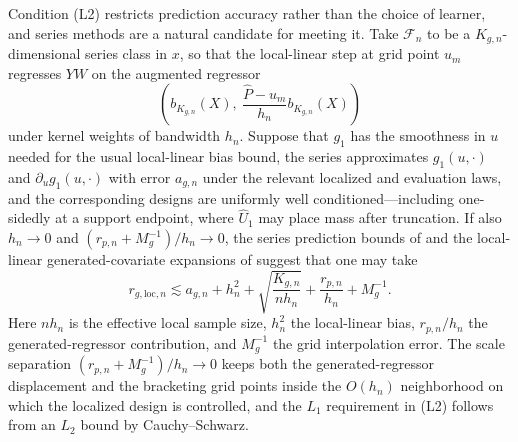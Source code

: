 \begin{remark}\label{rem:outcome_learner_construction}
Condition (L2) restricts prediction accuracy rather than the choice of learner, and series methods are a natural candidate for meeting it. Take $\mathcal F_n$ to be a $K_{g,n}$-dimensional series class in $x$, so that the local-linear step at grid point $u_m$ regresses $YW$ on the augmented regressor
\[
    \left(b_{K_{g,n}}(X),\
    \frac{\hat P-u_m}{h_n}b_{K_{g,n}}(X)\right)
\]
under kernel weights of bandwidth $h_n$. Suppose that $g_1$ has the smoothness in $u$ needed for the usual local-linear bias bound, the series approximates $g_1(u,\cdot)$ and $\partial_ug_1(u,\cdot)$ with error $a_{g,n}$ under the relevant localized and evaluation laws, and the corresponding designs are uniformly well conditioned---including one-sidedly at a support endpoint, where $\hat U_1$ may place mass after truncation. If also $h_n\to0$ and $(r_{p,n}+M_g^{-1})/h_n\to0$, the series prediction bounds of \citet{belloni2015series} and the local-linear generated-covariate expansions of \citet{mammen_rothe_schienle2012,lee2018partial_mean} suggest that one may take
\[
    r_{g,\mathrm{loc},n}
    \lesssim a_{g,n}+h_n^2
      +\sqrt{\frac{K_{g,n}}{nh_n}}
      +\frac{r_{p,n}}{h_n}
      +M_g^{-1}.
\]
Here $nh_n$ is the effective local sample size, $h_n^2$ the local-linear bias, $r_{p,n}/h_n$ the generated-regressor contribution, and $M_g^{-1}$ the grid interpolation error. The scale separation $(r_{p,n}+M_g^{-1})/h_n\to0$ keeps both the generated-regressor displacement and the bracketing grid points inside the $O(h_n)$ neighborhood on which the localized design is controlled, and the $L_1$ requirement in (L2) follows from an $L_2$ bound by Cauchy--Schwarz. 
\end{remark}


